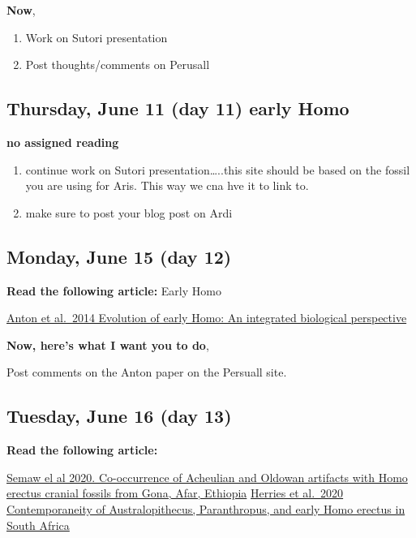 \documentclass[]{tufte-handout}
\begin{document}
\textbf{Now},

\begin{enumerate}
\def\labelenumi{\arabic{enumi}.}
\item
  Work on Sutori presentation
\item
  Post thoughts/comments on Perusall
\end{enumerate}

\hypertarget{thursday-june-11-day-11-early-homo}{%
\subsection{Thursday, June 11 (day 11) early
Homo}\label{thursday-june-11-day-11-early-homo}}

\textbf{no assigned reading}

\begin{enumerate}
\def\labelenumi{\arabic{enumi}.}
\item
  continue work on Sutori presentation\ldots..this site should be based
  on the fossil you are using for Aris. This way we cna hve it to link
  to.
\item
  make sure to post your blog post on Ardi
\end{enumerate}

\hypertarget{monday-june-15-day-12}{%
\subsection{Monday, June 15 (day 12)}\label{monday-june-15-day-12}}

\textbf{Read the following article:} Early Homo

\href{https://science.sciencemag.org/content/345/6192/1236828}{Anton et
al.~2014 Evolution of early Homo: An integrated biological perspective}

\textbf{Now, here's what I want you to do},

Post comments on the Anton paper on the Persuall site.

\hypertarget{tuesday-june-16-day-13}{%
\subsection{Tuesday, June 16 (day 13)}\label{tuesday-june-16-day-13}}

\textbf{Read the following article:}

\href{https://advances.sciencemag.org/lens/advances/6/10/eaaw4694}{Semaw
el al 2020. Co-occurrence of Acheulian and Oldowan artifacts with Homo
erectus cranial fossils from Gona, Afar, Ethiopia}
\href{https://www.uj.ac.za/newandevents/Pages/Contemporaneity-of-Australopithecus,-Paranthropus,-and-early-Homo-erectus-in-South-Africa.aspx}{Herries
et al.~2020 Contemporaneity of Australopithecus, Paranthropus, and early
Homo erectus in South Africa}
\end{document}
